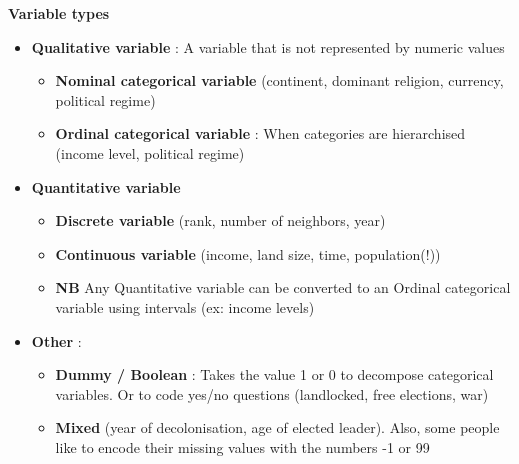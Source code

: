 \documentclass{beamer}
\begin{document}
\begin{frame}
    \textbf{Variable types}
    \vspace{0.2cm}
    \begin{itemize}
        \item \textbf{Qualitative variable} : A variable that is not represented by numeric values
        \begin{itemize}
            \item \textbf{Nominal categorical variable} (continent, dominant religion, currency, political regime)
            \item \textbf{Ordinal categorical variable} : When categories are hierarchised (income level, political regime)
        \end{itemize}
        \item \textbf{Quantitative variable}
        \begin{itemize}
            \item \textbf{Discrete variable} (rank, number of neighbors, year)
            \item \textbf{Continuous variable} (income, land size, time, population(!))
            \item \textbf{NB} Any Quantitative variable can be converted to an Ordinal categorical variable using intervals (ex: income levels)
        \end{itemize}
        \item \textbf{Other} :
        \begin{itemize}
            \item \textbf{Dummy / Boolean} : Takes the value 1 or 0 to decompose categorical variables. Or to code yes/no questions (landlocked, free elections, war)
            \item \textbf{Mixed} (year of decolonisation, age of elected leader). Also, some people like to encode their missing values with the numbers -1 or 99
        \end{itemize}
    \end{itemize}
\end{frame}
\end{document}

